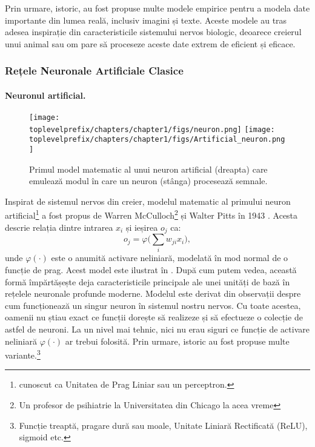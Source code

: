 \documentclass[../../book-main_ro.tex]{subfiles}
\begin{document}
Prin urmare, istoric, au fost propuse multe modele empirice pentru a modela date importante din lumea reală, inclusiv imagini și texte. Aceste modele au tras adesea inspirație din caracteristicile sistemului nervos biologic, deoarece creierul unui animal sau om pare să proceseze aceste date extrem de eficient și eficace.

\subsubsection{Rețele Neuronale Artificiale Clasice}
\paragraph{Neuronul artificial.}

\begin{figure}[t]
    \centering
\texttt{[image: \\toplevelprefix/chapters/chapter1/figs/neuron.png]} \hspace{3mm}
\texttt{[image: \\toplevelprefix/chapters/chapter1/figs/Artificial\_neuron.png]}
    \caption{Primul model matematic al unui neuron artificial (dreapta) care emulează modul în care un neuron (stânga) procesează semnale.}
    \label{fig:neuron}
\end{figure}

Inspirat de sistemul nervos din creier, modelul matematic al primului neuron artificial\footnote{cunoscut ca Unitatea de Prag Liniar sau un perceptron.} a fost propus de Warren McCulloch\footnote{Un profesor de psihiatrie la Universitatea din Chicago la acea vreme} și Walter Pitts în 1943 \cite{McCulloch-Pitts}. Acesta descrie relația dintre intrarea $x_i$ și ieșirea $o_j$ ca:
\begin{equation}
    o_j = \varphi\Big( \sum_i w_{ji}x_i\Big),
\end{equation}
unde $\varphi(\cdot)$ este o anumită activare neliniară, modelată în mod normal de o funcție de prag. Acest model este ilustrat în . După cum putem vedea, această formă împărtășește deja caracteristicile principale ale unei unități de bază în rețelele neuronale profunde moderne. Modelul este derivat din observații despre cum funcționează un singur neuron în sistemul nostru nervos. Cu toate acestea, oamenii nu știau exact ce funcții dorește să realizeze și să efectueze o colecție de astfel de neuroni. La un nivel mai tehnic, nici nu erau siguri ce funcție de activare neliniară $\varphi(\cdot)$ ar trebui folosită. Prin urmare, istoric au fost propuse multe variante.\footnote{Funcție treaptă, pragare dură sau moale, Unitate Liniară Rectificată (ReLU), sigmoid etc.}
\end{document}
